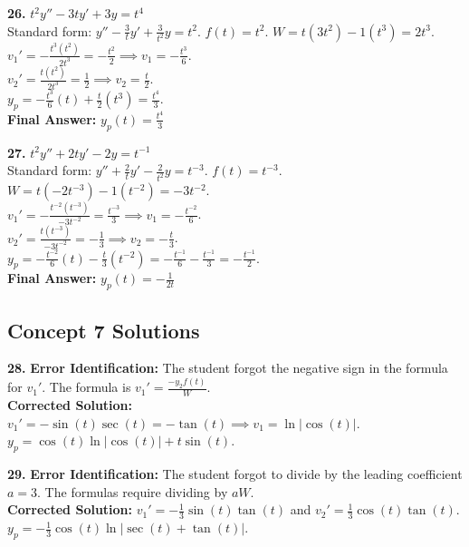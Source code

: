 \documentclass[11pt]{article}
\begin{document}
\vspace{0.5cm}
\textbf{26.} $t^2 y'' - 3t y' + 3y = t^4$ \\
Standard form: $y'' - \frac{3}{t}y' + \frac{3}{t^2}y = t^2$. $f(t) = t^2$. $W = t(3t^2) - 1(t^3) = 2t^3$. \\
$v_1' = -\frac{t^3(t^2)}{2t^3} = -\frac{t^2}{2} \implies v_1 = -\frac{t^3}{6}$. \\
$v_2' = \frac{t(t^2)}{2t^3} = \frac{1}{2} \implies v_2 = \frac{t}{2}$. \\
$y_p = -\frac{t^3}{6}(t) + \frac{t}{2}(t^3) = \frac{t^4}{3}$. \\
\textbf{Final Answer:} $y_p(t) = \frac{t^4}{3}$

\vspace{0.5cm}
\textbf{27.} $t^2 y'' + 2t y' - 2y = t^{-1}$ \\
Standard form: $y'' + \frac{2}{t}y' - \frac{2}{t^2}y = t^{-3}$. $f(t) = t^{-3}$. $W = t(-2t^{-3}) - 1(t^{-2}) = -3t^{-2}$. \\
$v_1' = -\frac{t^{-2}(t^{-3})}{-3t^{-2}} = \frac{t^{-3}}{3} \implies v_1 = -\frac{t^{-2}}{6}$. \\
$v_2' = \frac{t(t^{-3})}{-3t^{-2}} = -\frac{1}{3} \implies v_2 = -\frac{t}{3}$. \\
$y_p = -\frac{t^{-2}}{6}(t) - \frac{t}{3}(t^{-2}) = -\frac{t^{-1}}{6} - \frac{t^{-1}}{3} = -\frac{t^{-1}}{2}$. \\
\textbf{Final Answer:} $y_p(t) = -\frac{1}{2t}$

\subsection*{Concept 7 Solutions}
\textbf{28.} \textbf{Error Identification:} The student forgot the negative sign in the formula for $v_1'$. The formula is $v_1' = \frac{-y_2 f(t)}{W}$. \\
\textbf{Corrected Solution:} $v_1' = -\sin(t)\sec(t) = -\tan(t) \implies v_1 = \ln|\cos(t)|$. \\
$y_p = \cos(t)\ln|\cos(t)| + t\sin(t)$.

\vspace{0.5cm}
\textbf{29.} \textbf{Error Identification:} The student forgot to divide by the leading coefficient $a=3$. The formulas require dividing by $aW$. \\
\textbf{Corrected Solution:} $v_1' = -\frac{1}{3}\sin(t)\tan(t)$ and $v_2' = \frac{1}{3}\cos(t)\tan(t)$. \\
$y_p = -\frac{1}{3}\cos(t)\ln|\sec(t)+\tan(t)|$.
\end{document}

